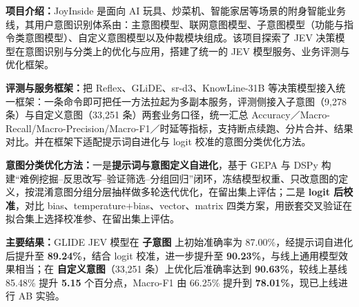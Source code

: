 
\textbf{项目介绍：}JoyInside 是面向 AI 玩具、炒菜机、智能家居等场景的附身智能业务线，其用户意图识别体系由：主意图模型、联网意图模型、子意图模型（功能与指令类意图模型）、自定义意图模型以及仲裁模块组成。该项目探索了 JEV 决策模型在意图识别与分类上的优化与应用，搭建了统一的 JEV 模型服务、业务评测与优化框架。\par
\begin{experienceitems}
  \item \textbf{评测与服务框架：}把 Reflex、GLiDE、sr-d3、KnowLine-31B 等决策模型接入统一框架：一条命令即可把任一方法拉起为多副本服务，评测侧接入子意图（9,278 条）与自定义意图（33,251 条）两套业务口径，统一汇总 Accuracy／Macro-Recall/Macro-Precision/Macro-F1／时延等指标，支持断点续跑、分片合并、结果对比。并在框架下适配提示词自进化与 logit 校准的意图分类优化方法。
  \item \textbf{意图分类优化方法：}一是\textbf{提示词与意图定义自进化}，基于 GEPA 与 DSPy 构建“难例挖掘--反思改写--验证筛选--分组回归”闭环，冻结模型权重、只改意图的定义，按混淆意图分组分层抽样做多轮迭代优化，在留出集上评估；二是 \textbf{logit 后校准}，对比 bias、temperature+bias、vector、matrix 四类方案，用嵌套交叉验证在拟合集上选择校准参、在留出集上评估。
  \item \textbf{主要结果：}GLIDE JEV 模型在 \textbf{子意图} 上初始准确率为 87.00\%，经提示词自进化后提升至 \textbf{89.24\%}，结合 logit 校准，进一步提升至 \textbf{90.23\%}，与线上通用模型效果相当；在 \textbf{自定义意图}（33,251 条）上优化后准确率达到 \textbf{90.63\%}，较线上基线 85.48\% 提升 \textbf{5.15} 个百分点，Macro-F1 由 66.25\% 提升到 \textbf{78.01\%}，现已上线进行 AB 实验。
\end{experienceitems}

\par{}
